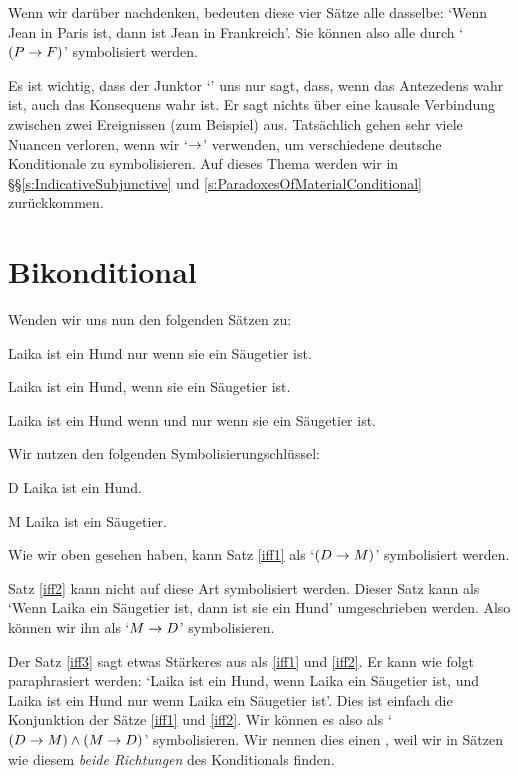Wenn wir darüber nachdenken, bedeuten diese vier Sätze alle dasselbe: `Wenn Jean in Paris ist, dann ist Jean in Frankreich'. Sie können also alle durch `$(P \rightarrow F)$' symbolisiert werden.

Es ist wichtig, dass der Junktor `\eif' uns nur sagt, dass, wenn das Antezedens wahr ist, auch das Konsequens wahr ist. Er sagt nichts über eine kausale Verbindung zwischen zwei Ereignissen (zum Beispiel) aus. Tatsächlich gehen sehr viele Nuancen verloren, wenn wir `$\rightarrow$' verwenden, um verschiedene deutsche Konditionale zu symbolisieren. Auf dieses Thema werden wir in \S\S\ref{s:IndicativeSubjunctive} und \ref{s:ParadoxesOfMaterialConditional} zurückkommen.

\section{Bikonditional}
Wenden wir uns nun den folgenden Sätzen zu:
	\begin{earg}
		\item[\ex{iff1}] Laika ist ein Hund nur wenn sie ein Säugetier ist.
		\item[\ex{iff2}] Laika ist ein Hund, wenn sie ein Säugetier ist.
		\item[\ex{iff3}] Laika ist ein Hund wenn und nur wenn sie ein Säugetier ist.
	\end{earg}
Wir nutzen den folgenden Symbolisierungschlüssel:
	\begin{ekey}
		\item[D] Laika ist ein Hund.
		\item[M] Laika ist ein Säugetier.
	\end{ekey}
Wie wir oben gesehen haben, kann Satz \ref{iff1} als `$(D \rightarrow M)$' symbolisiert werden. 

Satz \ref{iff2} kann nicht auf diese Art symbolisiert werden. Dieser Satz kann als `Wenn Laika ein Säugetier ist, dann ist sie ein Hund' umgeschrieben werden. Also können wir ihn als `$M \rightarrow D$' symbolisieren.

Der Satz \ref{iff3} sagt etwas Stärkeres aus als \ref{iff1} und \ref{iff2}. Er kann wie folgt paraphrasiert werden: `Laika ist ein Hund, wenn Laika ein Säugetier ist, und Laika ist ein Hund nur wenn Laika ein Säugetier ist'. Dies ist einfach die Konjunktion der Sätze \ref{iff1} und \ref{iff2}. Wir können es also als `$(D \rightarrow M) \wedge (M \rightarrow D)$' symbolisieren. Wir nennen dies einen , weil wir in Sätzen wie diesem \emph{beide Richtungen} des Konditionals finden.

